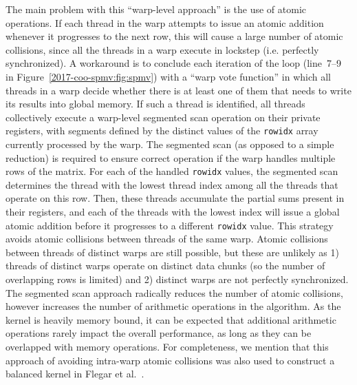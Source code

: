 The main problem with this ``warp-level approach'' is the use of atomic operations.
If each thread in the warp attempts to issue an atomic addition whenever it
progresses to the next row, this will cause a large number of atomic
collisions, since all the threads in a warp execute in lockstep (i.e. perfectly
synchronized).
A workaround is to conclude each iteration of the loop (line~7--9 in
Figure~\ref{2017-coo-spmv:fig:spmv})
with a ``warp vote function'' in which all threads in a warp 
decide whether there is at least one of them that needs to
write its results into global memory.
If such a thread is identified, all threads collectively execute a
warp-level segmented scan operation on their private registers, with segments
defined by the distinct values of the \texttt{rowidx} array currently processed by
the warp.
The segmented scan (as opposed to a simple reduction) is required to
ensure correct operation if the warp handles multiple rows of the matrix.
For each of the handled \texttt{rowidx} values, the segmented scan determines
the thread with the lowest thread index among all the threads that operate on
this row.
Then, these threads accumulate the partial sums present in their registers,
and each of the threads with the lowest index will issue a global
atomic addition before it progresses to a different \texttt{rowidx} value.
This strategy avoids atomic collisions between threads of the same warp.
Atomic collisions between threads of distinct warps are still
possible, but these are unlikely as 
1) threads of distinct warps operate on distinct data chunks (so the number of
overlapping rows is limited) and
2) distinct warps are not perfectly synchronized.
The segmented scan approach radically reduces the number of atomic collisions, 
however increases the number of arithmetic operations in the algorithm.
As the \spmv kernel is heavily memory bound, it can be expected that 
additional arithmetic operations rarely impact the overall performance,
as long as they can be overlapped with memory operations.
For completeness, we mention that this approach of avoiding intra-warp
atomic collisions was also used to construct a balanced \csr \spmv kernel in
Flegar et al.~\cite{csri}.

